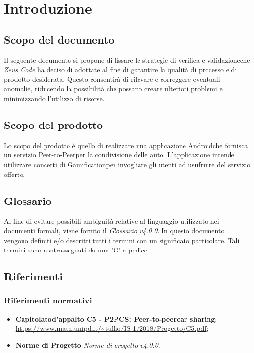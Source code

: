 \section{Introduzione}
\subsection{Scopo del documento}
Il seguente documento si propone di fissare le strategie di verifica e validazione\glosp che \textit{Zeus Code} ha deciso di adottate al fine di garantire la qualità di processo e di prodotto desiderata. \newline
Questo consentirà di rilevare e correggere eventuali anomalie, riducendo la possibilità che possano creare ulteriori problemi e minimizzando l'utilizzo di risorse. 
\subsection{Scopo del prodotto}
Lo scopo del prodotto è quello di realizzare una applicazione Android\glosp che fornisca un servizio Peer-to-Peer\glosp per la condivisione delle auto. L'applicazione intende utilizzare concetti di Gamification\glosp per invogliare gli utenti ad usufruire del servizio offerto.
\subsection{Glossario}
Al fine di evitare possibili ambiguità relative al linguaggio utilizzato nei documenti formali, viene fornito il \textit{Glossario v4.0.0}. In questo documento vengono definiti e/o descritti tutti i termini con un significato particolare. Tali termini sono contrassegnati da una 'G' a pedice.
\subsection{Riferimenti}
\subsubsection{Riferimenti normativi}
\begin{itemize}

\item \textbf{Capitolato\glosp d'appalto C5 - P2PCS: Peer-to-peer\glosp car sharing}: \\ \url{https://www.math.unipd.it/~tullio/IS-1/2018/Progetto/C5.pdf};
\item \textbf{Norme di Progetto} \textit{Norme di progetto v4.0.0}.
\end{itemize}
